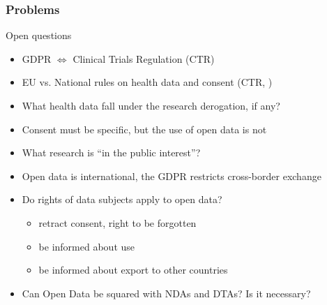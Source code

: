 \documentclass[xcolor=dvipsnames]{beamer}
\begin{document}
\begin{frame}
	\frametitle{Problems}
	
	\begin{block}{Open questions}
	\begin{itemize}
	\item GDPR $\Leftrightarrow$ Clinical Trials Regulation (CTR) {\scriptsize\cite{dittrich2015esmod}}
	\item EU vs. National rules on health data and consent (CTR, {\scriptsize\cite{chassang2017impact}})
	\item What health data fall under the research derogation, if any?
	\item Consent must be specific, but the use of open data is not
	\item What research is ``in the public interest''?
	\item Open data is international, the GDPR restricts cross-border exchange
	\item Do rights of data subjects apply to open data?
	\begin{itemize}
	\item retract consent, right to be forgotten
	\item be informed about use
	\item be informed about export to other countries
	\end{itemize}
	\item Can Open Data be squared with NDAs and DTAs? Is it necessary?
	\end{itemize}
	\end{block}	
\end{frame}
\end{document}
